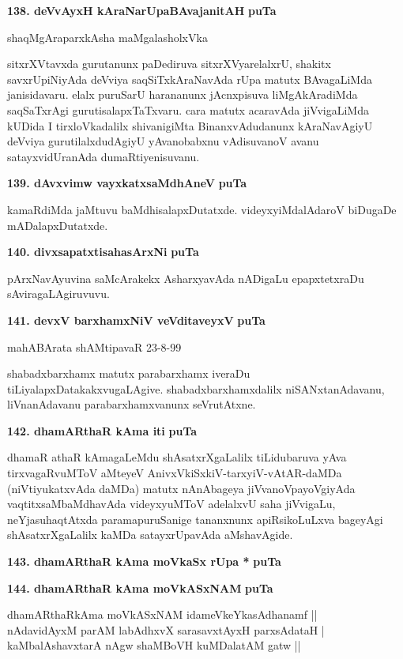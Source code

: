 \medskip
\noindent
\textbf{138. deVvAyxH kAraNarUpaBAvajanitAH} \hfill{\bf puTa \pageref{247a}}

\hfill{shaqMgAraparxkAsha maMgalasholxVka}

\smallskip
sitxrXVtavxda gurutanunx paDediruva sitxrXVyarelalxrU, shakitx savxrUpiNiyAda deVviya saqSiTxkAraNavAda rUpa matutx BAvagaLiMda janisidavaru. elalx puruSarU harananunx jAcnxpisuva liMgAkAradiMda saqSaTxrAgi gurutisalapxTaTxvaru. cara matutx acaravAda jiVvigaLiMda kUDida I tirxloVkadalilx shivanigiMta BinanxvAdudanunx kAraNavAgiyU deVviya gurutilalxdudAgiyU yAvanobabxnu vAdisuvanoV avanu satayxvidUranAda dumaRtiyenisuvanu.

\medskip
\noindent
\textbf{139. dAvxvimw vayxkatxsaMdhAneV} \hfill{\bf puTa \pageref{86}}

\smallskip
kamaRdiMda jaMtuvu baMdhisalapxDutatxde. videyxyiMdalAdaroV biDugaDe mADalapxDutatxde.

\medskip
\noindent
\textbf{140. divxsapatxtisahasArxNi} \hfill{\bf puTa \pageref{155b}}

\smallskip
pArxNavAyuvina saMcArakekx AsharxyavAda nADigaLu epapxtetxraDu sAviragaLAgiruvuvu.

\eject

\noindent
\textbf{141. devxV barxhamxNiV veVditaveyxV} \hfill{\bf puTa \pageref{149c}}

\hfill{mahABArata shAMtipavaR 23-8-99}

\smallskip
shabadxbarxhamx matutx parabarxhamx iveraDu tiLiyalapxDatakakxvugaLAgive. shabadxbarxhamxdalilx niSANxtanAdavanu, liVnanAdavanu parabarxhamxvanunx seVrutAtxne.


\medskip
\noindent
\textbf{142. dhamARthaR kAma iti} \hfill{\bf puTa \pageref{page89b}}

\smallskip
dhamaR athaR kAmagaLeMdu shAsatxrXgaLalilx tiLidubaruva yAva tirxvagaRvuMToV aMteyeV AnivxVkiSxkiV-tarxyiV-vAtAR-daMDa (niVtiyukatxvAda daMDa) matutx nAnAbageya jiVvanoVpayoVgiyAda vaqtitxsaMbaMdhavAda videyxyuMToV adelalxvU saha jiVvigaLu, neYjasuhaqtAtxda paramapuruSanige tananxnunx apiRsikoLuLxva bageyAgi shAsatxrXgaLalilx kaMDa satayxrUpavAda aMshavAgide.

\medskip
\noindent
\textbf{143. dhamARthaR kAma moVkaSx rUpa *} \hfill{\bf puTa \pageref{94b}}

\medskip
\noindent
\textbf{144. dhamARthaR kAma moVkASxNAM} \hfill{\bf puTa \pageref{159b}}

\begin{shloka}
dhamARthaRkAma moVkASxNAM idameVkeYkasAdhanamf ||\\
nAdavidAyxM parAM labAdhxvX sarasavxtAyxH parxsAdataH |\\
kaMbalAshavxtarA nAgw shaMBoVH kuMDalatAM gatw ||
\end{shloka}

